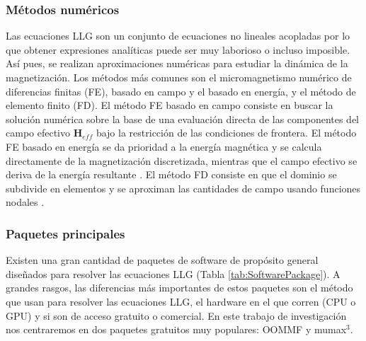 \subsubsection{Métodos numéricos}
Las ecuaciones LLG son un conjunto de ecuaciones no lineales acopladas por lo que obtener expresiones analíticas puede ser muy laborioso o incluso imposible. Así pues, se realizan aproximaciones numéricas para estudiar la dinámica de la magnetización. Los métodos más comunes son el micromagnetismo numérico de diferencias finitas (FE), basado en campo y el basado en energía, y el método de elemento finito (FD). El método FE basado en campo consiste en buscar la solución numérica sobre la base de una evaluación directa de las componentes del campo efectivo $\bm{H}_{eff}$ bajo la restricción de las condiciones de frontera. El método FE basado en energía se da prioridad a la energía magnética y se calcula directamente de la magnetización discretizada, mientras que el campo efectivo se deriva de la energía resultante \cite{miltat2007numerical}. El método FD consiste en que el dominio se subdivide en elementos y se aproximan las cantidades de campo usando funciones nodales \cite{FiniteElement}.

\subsubsection{Paquetes principales}
Existen una gran cantidad de paquetes de software de propósito general diseñados para resolver las ecuaciones LLG (Tabla \ref{tab:SoftwarePackage}). A grandes rasgos, las diferencias más importantes de estos paquetes son el método que usan para resolver las ecuaciones LLG, el hardware en el que corren (CPU o GPU) y si son de acceso gratuito o comercial\cite{Tomorrow}. En este trabajo de investigación nos centraremos en dos paquetes gratuitos muy populares: OOMMF y mumax$^3$.

